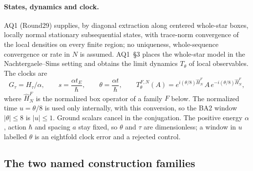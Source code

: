 \paragraph{States, dynamics and clock.}
AQ1 (Round29) supplies, by diagonal extraction along centered whole-star boxes,
locally normal stationary subsequential states, with trace-norm convergence of
the local densities on every finite region; no uniqueness, whole-sequence
convergence or rate in $N$ is assumed. AQ1~\S3 places the whole-star model in
the Nachtergaele--Sims setting and obtains the limit dynamics $T_\theta$ of
local observables. The clocks are
\begin{equation}
 G_\tau=H_\tau/\alpha,\qquad s=\frac{\alpha t_E}{\hbar},\qquad
 \theta=\frac{\alpha t}{\hbar},\qquad
 T^{F,N}_\theta(A)=e^{i(\theta/8)\widehat H^{F}_N}\,A\,e^{-i(\theta/8)\widehat H^{F}_N},
 \label{eq:dict-clock}
\end{equation}
where $\widehat H^F_N$ is the normalized box operator of a family $F$ below.
The normalized time $u=\theta/8$ is used only internally, with this
conversion, so the BA2 window $|\theta|\le8$ is $|u|\le1$. Ground scalars
cancel in the conjugation. The positive energy $\alpha$, action $\hbar$ and
spacing $a$ stay fixed, so $\theta$ and $\tau$ are dimensionless; a window in
$u$ labelled $\theta$ is an eightfold clock error and a rejected control.

\subsection{The two named construction families}
\label{sec:families}

